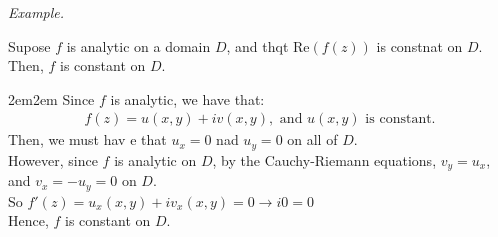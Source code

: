 \documentclass[10pt]{paper}
\newcommand{\gspc}{\vspace{0.13cm}} %
\newcommand{\gline}[0]{\gspc\\} %
\renewcommand{\Re}[1]{\text{Re}\left(#1\right)}
\let\endoldproof\endproof
\renewenvironment{proof}[1][\proofname]
  {\vspace{0.2cm}\begin{adjustwidth}{2em}{2em}
   \oldproof[#1]}
  {\endoldproof
\end{adjustwidth}}
\renewenvironment{example}{
  \begin{tcolorbox}[colback=gray!2, colframe=gray!40!white, coltitle=green!20!black, boxrule=3pt, sharp corners, breakable]
    \textit{Example.}
}{\end{tcolorbox}}
\begin{document}
\begin{example}
  Supose $f$ is analytic on a domain $D$, and thqt $\Re{f(z)}$ is constnat on $D$. Then, $f$ is constant on $D$.
  \begin{proof}
    Since $f$ is analytic, we have that:
    \begin{align*}
      f(z) = u(x,y) + iv(x,y), \text{ and }u(x,y)\text{ is constant.}
    \end{align*}
    Then, we must hav e that $u_x=0$ nad $u_y = 0$ on all of $D$. \gline{}
    However, since $f$ is analytic on $D$, by the Cauchy-Riemann equations, $v_y=u_x$, and $v_x = -u_y=0$ on $D$. \gline{}
    So $f'(z)= u_x(x,y) + iv_x(x,y)=0\to i0=0$\gline{}
    Hence, $f$ is constant on $D$. 
  \end{proof}
\end{example}
\end{document}
